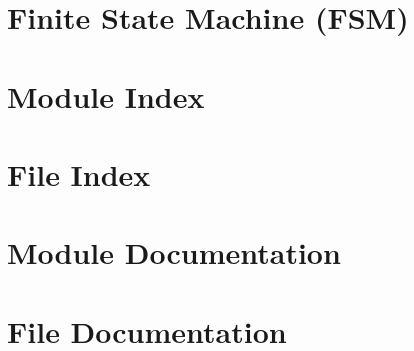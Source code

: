 \documentclass[twoside]{book}
\newcommand{\+}{\discretionary{\mbox{\scriptsize$\hookleftarrow$}}{}{}}
\newcommand{\clearemptydoublepage}{%
  \newpage{\pagestyle{empty}\cleardoublepage}%
}
\begin{document}
\chapter{Finite State Machine (F\+SM)}
\label{_f_s_m_page}

\chapter{Module Index}

\chapter{File Index}

\chapter{Module Documentation}









\chapter{File Documentation}



















\backmatter
\newpage
{}
\clearemptydoublepage
{}
\printindex
\end{document}
